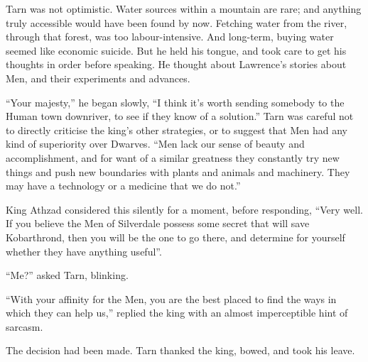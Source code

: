 Tarn was not optimistic.  Water sources within a mountain are rare; and anything truly accessible would have been found by now.  Fetching water from the river, through that forest, was too labour-intensive.  And long-term, buying water seemed like economic suicide.  But he held his tongue, and took care to get his thoughts in order before speaking.  He thought about Lawrence's stories about Men, and their experiments and advances.

``Your majesty,'' he began slowly, ``I think it's worth sending somebody to the Human town downriver, to see if they know of a solution.''  Tarn was careful not to directly criticise the king's other strategies, or to suggest that Men had any kind of superiority over Dwarves.
``Men lack our sense of beauty and accomplishment, and for want of a similar greatness they constantly try new things and push new boundaries with plants and animals and machinery.  They may have a technology or a medicine that we do not.''

King Athzad considered this silently for a moment, before responding, ``Very well.  If you believe the Men of Silverdale possess some secret that will save Kobarthrond, then you will be the one to go there, and determine for yourself whether they have anything useful''.

``Me?'' asked Tarn, blinking.

``With your affinity for the Men, you are the best placed to find the ways in which they can help us,'' replied the king with an almost imperceptible hint of sarcasm.

The decision had been made.  Tarn thanked the king, bowed, and took his leave.
